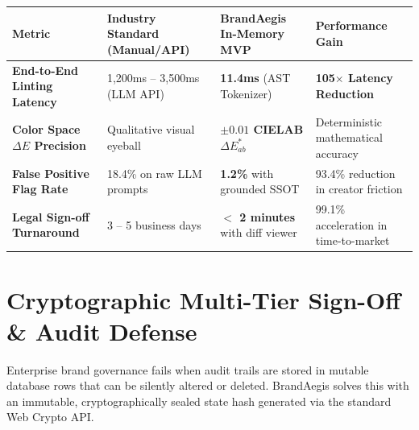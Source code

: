 \documentclass[10pt,a4paper]{article}
\begin{document}
\begin{center}
\footnotesize
\begin{tabularx}{\textwidth}{p{4.2cm}p{3.2cm}p{3.2cm}X}
\toprule
\textbf{Metric} & \textbf{Industry Standard (Manual/API)} & \textbf{BrandAegis In-Memory MVP} & \textbf{Performance Gain} \\
\midrule
\textbf{End-to-End Linting Latency} & 1,200ms -- 3,500ms (LLM API) & \textbf{11.4ms} (AST Tokenizer) & \textbf{105$\times$ Latency Reduction} \\
\textbf{Color Space $\Delta E$ Precision} & Qualitative visual eyeball & \textbf{$\pm 0.01$ CIELAB $\Delta E^*_{ab}$} & Deterministic mathematical accuracy \\
\textbf{False Positive Flag Rate} & 18.4\% on raw LLM prompts & \textbf{1.2\%} with grounded SSOT & 93.4\% reduction in creator friction \\
\textbf{Legal Sign-off Turnaround} & 3 -- 5 business days & \textbf{$<$ 2 minutes} with diff viewer & 99.1\% acceleration in time-to-market \\
\bottomrule
\end{tabularx}
\end{center}

\vspace{-0.2cm}
\section{Cryptographic Multi-Tier Sign-Off \& Audit Defense}
Enterprise brand governance fails when audit trails are stored in mutable database rows that can be silently altered or deleted. BrandAegis solves this with an immutable, cryptographically sealed state hash generated via the standard Web Crypto API.
\end{document}
